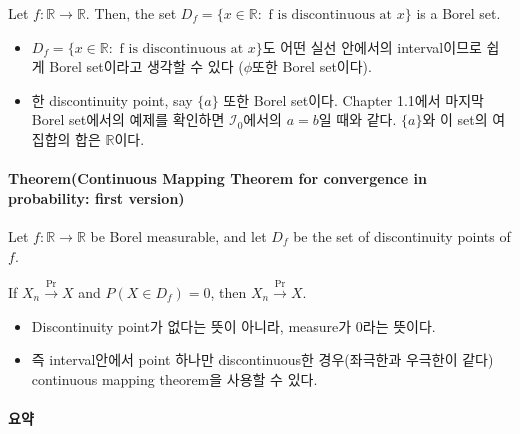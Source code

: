 \documentclass[]{article}
\let\oldparagraph\paragraph
\renewcommand{\paragraph}[1]{\oldparagraph{#1}\mbox{}}
\begin{document}
Let \(f:\mathbb{R}\rightarrow \mathbb{R}\). Then, the set
\(D_f=\{x\in\mathbb{R} : \mbox{ f is discontinuous at }x\}\) is a Borel
set.

\begin{itemize}
\item
  \(D_f=\{x\in\mathbb{R} : \mbox{ f is discontinuous at }x\}\)도 어떤
  실선 안에서의 interval이므로 쉽게 Borel set이라고 생각할 수 있다
  (\(\phi\)또한 Borel set이다).
\item
  한 discontinuity point, say \(\{a\}\) 또한 Borel set이다. Chapter
  1.1에서 마지막 Borel set에서의 예제를 확인하면 \(\mathcal{I}_0\)에서의
  \(a=b\)일 때와 같다. \(\{a\}\)와 이 set의 여집합의 합은
  \(\mathbb{R}\)이다.
\end{itemize}

\hypertarget{theoremcontinuous-mapping-theorem-for-convergence-in-probability-first-version-1}{%
\paragraph{Theorem(Continuous Mapping Theorem for convergence in
probability: first
version)}\label{theoremcontinuous-mapping-theorem-for-convergence-in-probability-first-version-1}}

Let \(f:\mathbb{R}\rightarrow \mathbb{R}\) be Borel measurable, and let
\(D_f\) be the set of discontinuity points of \(f\).

If \(X_n\stackrel{\text{Pr}}\rightarrow X\) and \(P(X\in D_f)=0\), then
\(X_n\stackrel{\text{Pr}}\rightarrow X\).

\begin{itemize}
\item
  Discontinuity point가 없다는 뜻이 아니라, measure가 0라는 뜻이다.
\item
  즉 interval안에서 point 하나만 discontinuous한 경우(좌극한과 우극한이
  같다) continuous mapping theorem을 사용할 수 있다.
\end{itemize}

\hypertarget{uxc694uxc57d}{%
\paragraph{요약}\label{uxc694uxc57d}}
\end{document}
